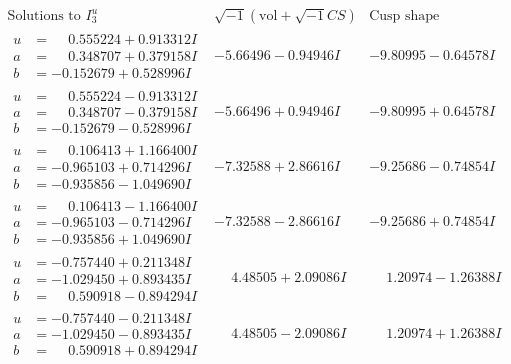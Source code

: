 \documentclass[1p]{elsarticle_modified}
\theoremstyle{definition}
\newcommand{\I}{\sqrt{-1}}
\begin{document}
$$\begin{array}{c|c|c}  
\text{Solutions to }I^u_{3}& \I (\text{vol} + \sqrt{-1}CS) & \text{Cusp shape}\\
 \hline 
\begin{aligned}
u &= \phantom{-}0.555224 + 0.913312 I \\
a &= \phantom{-}0.348707 + 0.379158 I \\
b &= -0.152679 + 0.528996 I\end{aligned}
 & -5.66496 - 0.94946 I & -9.80995 - 0.64578 I \\ \hline\begin{aligned}
u &= \phantom{-}0.555224 - 0.913312 I \\
a &= \phantom{-}0.348707 - 0.379158 I \\
b &= -0.152679 - 0.528996 I\end{aligned}
 & -5.66496 + 0.94946 I & -9.80995 + 0.64578 I \\ \hline\begin{aligned}
u &= \phantom{-}0.106413 + 1.166400 I \\
a &= -0.965103 + 0.714296 I \\
b &= -0.935856 - 1.049690 I\end{aligned}
 & -7.32588 + 2.86616 I & -9.25686 - 0.74854 I \\ \hline\begin{aligned}
u &= \phantom{-}0.106413 - 1.166400 I \\
a &= -0.965103 - 0.714296 I \\
b &= -0.935856 + 1.049690 I\end{aligned}
 & -7.32588 - 2.86616 I & -9.25686 + 0.74854 I \\ \hline\begin{aligned}
u &= -0.757440 + 0.211348 I \\
a &= -1.029450 + 0.893435 I \\
b &= \phantom{-}0.590918 - 0.894294 I\end{aligned}
 & \phantom{-}4.48505 + 2.09086 I & \phantom{-}1.20974 - 1.26388 I \\ \hline\begin{aligned}
u &= -0.757440 - 0.211348 I \\
a &= -1.029450 - 0.893435 I \\
b &= \phantom{-}0.590918 + 0.894294 I\end{aligned}
 & \phantom{-}4.48505 - 2.09086 I & \phantom{-}1.20974 + 1.26388 I \\ \hline\begin{aligned}

\end{aligned}
\end{array}$$
\end{document}
